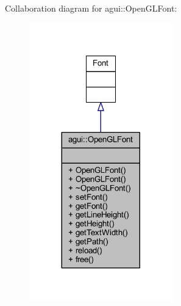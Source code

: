Collaboration diagram for agui\+:\+:Open\+G\+L\+Font\+:\nopagebreak
\begin{figure}[H]
\begin{center}
\leavevmode
\includegraphics[width=176pt]{classagui_1_1_open_g_l_font__coll__graph}
\end{center}
\end{figure}
